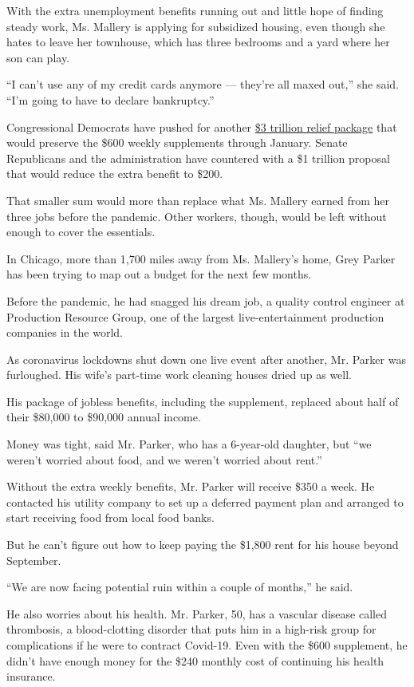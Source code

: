 With the extra unemployment benefits running out and little hope of
finding steady work, Ms. Mallery is applying for subsidized housing,
even though she hates to leave her townhouse, which has three bedrooms
and a yard where her son can play.

``I can't use any of my credit cards anymore --- they're all maxed
out,'' she said. ``I'm going to have to declare bankruptcy.''

Congressional Democrats have pushed for another
\href{https://www.nytimes.com/2020/07/28/us/politics/coronavirus-relief-bills-house-senate.html}{\$3
trillion relief package} that would preserve the \$600 weekly
supplements through January. Senate Republicans and the administration
have countered with a \$1 trillion proposal that would reduce the extra
benefit to \$200.

That smaller sum would more than replace what Ms. Mallery earned from
her three jobs before the pandemic. Other workers, though, would be left
without enough to cover the essentials.

In Chicago, more than 1,700 miles away from Ms. Mallery's home, Grey
Parker has been trying to map out a budget for the next few months.

Before the pandemic, he had snagged his dream job, a quality control
engineer at Production Resource Group, one of the largest
live-entertainment production companies in the world.

As coronavirus lockdowns shut down one live event after another, Mr.
Parker was furloughed. His wife's part-time work cleaning houses dried
up as well.

His package of jobless benefits, including the supplement, replaced
about half of their \$80,000 to \$90,000 annual income.

Money was tight, said Mr. Parker, who has a 6-year-old daughter, but
``we weren't worried about food, and we weren't worried about rent.''

Without the extra weekly benefits, Mr. Parker will receive \$350 a week.
He contacted his utility company to set up a deferred payment plan and
arranged to start receiving food from local food banks.

But he can't figure out how to keep paying the \$1,800 rent for his
house beyond September.

``We are now facing potential ruin within a couple of months,'' he said.

He also worries about his health. Mr. Parker, 50, has a vascular disease
called thrombosis, a blood-clotting disorder that puts him in a
high-risk group for complications if he were to contract Covid-19. Even
with the \$600 supplement, he didn't have enough money for the \$240
monthly cost of continuing his health insurance.

